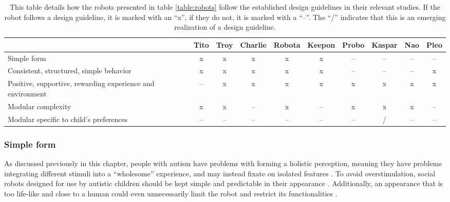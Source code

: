 \begin{table}
 \bgroup
  \def\arraystretch{2}
  \centering
  \begin{tabular}{|p{2cm}|c|c|c|c|c|c|c|c|c|}
    \hline
     & 
    \scriptsize{Tito} &
    \scriptsize{Troy} &
    \scriptsize{Charlie} &
    \scriptsize{Robota} &
    \scriptsize{Keepon} &
    \scriptsize{Probo} &
    \scriptsize{Kaspar} &
    \scriptsize{Nao} &
    \scriptsize{Pleo} 
    \\\hline
    \scriptsize{Simple form} & x & x & x & x & x & – & – & – & – \\
    \scriptsize{Consistent, structured, simple behavior} & x & x & x & x & x & – & – & – & x \\
    \scriptsize{Positive, supportive, rewarding experience and environment} & – & x & x & x & x & x & x & x & x \\
    \scriptsize{Modular complexity} & x & x & – & x & – & x & x & x & –  \\
    \scriptsize{Modular specific to child's preferences} & – & – & – & – & – & – & / & – & – \\
     \hline
  \end{tabular}
  \caption{This table details how the robots presented in table \ref{table:robots} follow the established design guidelines in their relevant studies. If the robot follows a design guideline, it is marked with an ``x'', if they do not, it is marked with a ``–''. The ``/'' indicates that this is an emerging realization of a design guideline.}
  \label{table:guidelines}
  \egroup
\end{table}


\subsubsection{Simple form}

As discussed previously in this chapter, people with autism have problems with forming a holistic perception, meaning they have problems integrating different stimuli into a ``wholesome'' experience, and may instead fixate on isolated features \cite{designSpaces, frith2003autism, giullian2010detailed}. To avoid overstimulation, social robots designed for use by autistic children should be kept simple and predictable in their appearance \cite{designSpaces, kozima2009keepon, robins2007eliciting}. Additionally, an appearance that is too life-like and close to a human could even unnecessarily limit the robot and restrict its functionalities \cite{designSpaces}.

